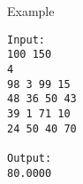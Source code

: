 Example
\begin{verbatim}
Input:
100 150
4
98 3 99 15
48 36 50 43
39 1 71 10
24 50 40 70

Output:
80.0000
\end{verbatim}